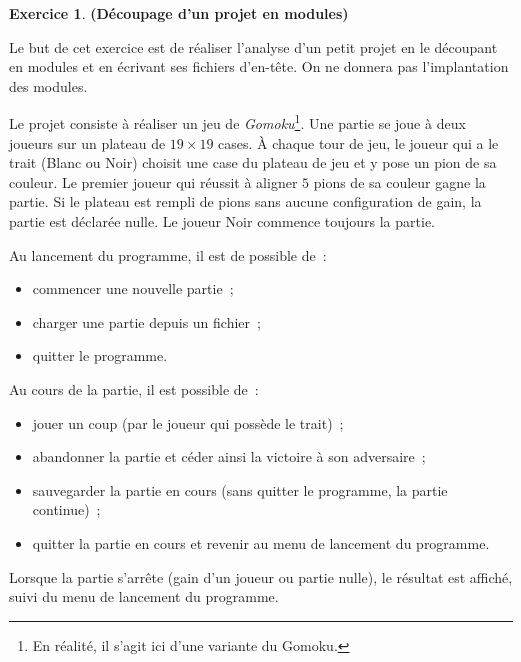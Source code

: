 \documentclass[12pt]{article}
\theoremstyle{definition}
\newtheorem{Exercice}{Exercice}
\begin{document}
\begin{Exercice} {\bf (Découpage d'un projet en modules)}\smallskip

Le but de cet exercice est de réaliser l'analyse d'un petit projet en le
découpant en modules et en écrivant ses fichiers d'en-tête. On ne donnera
pas l'implantation des modules.
\smallskip

Le projet consiste  à réaliser un jeu de {\em Gomoku}\footnote{En réalité,
il  s'agit ici d'une variante du Gomoku.}. Une partie se joue à deux joueurs
sur un plateau de $19 \times 19$ cases. À chaque tour de jeu, le joueur
qui a le trait (Blanc ou Noir) choisit une case du plateau de jeu et y
pose un pion de sa couleur. Le premier joueur qui réussit à aligner $5$
pions de sa couleur gagne la partie. Si le plateau est rempli de pions
sans aucune configuration de gain, la partie est déclarée nulle. Le joueur
Noir commence toujours la partie.
\smallskip

Au lancement du programme, il est de possible de~:
\begin{itemize}
    \item commencer une nouvelle partie~;
    \smallskip

    \item charger une partie depuis un fichier~;
    \smallskip

    \item quitter le programme.
\end{itemize}
Au cours de la partie, il est possible de~:
\begin{itemize}
    \item jouer un coup (par le joueur qui possède le trait)~;
    \smallskip
    
    \item abandonner la partie et céder ainsi la victoire à son 
    adversaire~;
    \smallskip

    \item sauvegarder la partie en cours (sans quitter le programme, la
    partie continue)~;
    \smallskip

    \item quitter la partie en cours et revenir au menu de lancement du
    programme.
\end{itemize}
Lorsque la partie s'arrête (gain d'un joueur ou partie nulle), le résultat
est affiché, suivi du menu de lancement du programme.
\smallskip


\end{Exercice}
\end{document}
